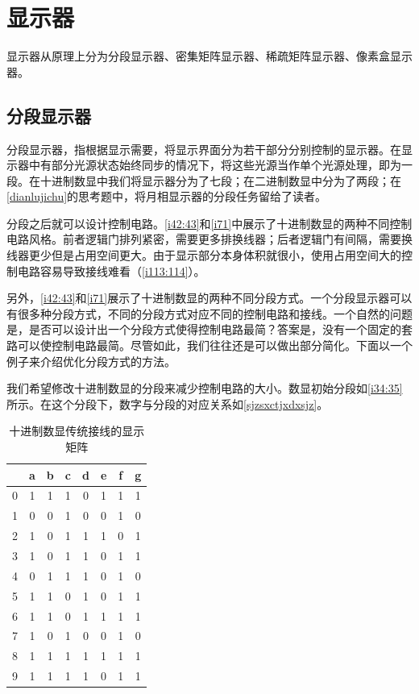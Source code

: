 

\section{显示器}
显示器从原理上分为分段显示器、密集矩阵显示器、稀疏矩阵显示器、像素盒显示器。

\subsection{分段显示器}
分段显示器，指根据显示需要，将显示界面分为若干部分分别控制的显示器。在显示器中有部分光源状态始终同步的情况下，将这些光源当作单个光源处理，即为一段。在十进制数显中我们将显示器分为了七段；在二进制数显中分为了两段；在\autoref{dianlujichu}的思考题中，将月相显示器的分段任务留给了读者。

分段之后就可以设计控制电路。\autoref{i42:43}和\autoref{i71}中展示了十进制数显的两种不同控制电路风格。前者逻辑门排列紧密，需要更多排换线器；后者逻辑门有间隔，需要换线器更少但是占用空间更大。由于显示部分本身体积就很小，使用占用空间大的控制电路容易导致接线难看（\autoref{i113:114}）。

另外，\autoref{i42:43}和\autoref{i71}展示了十进制数显的两种不同分段方式。一个分段显示器可以有很多种分段方式，不同的分段方式对应不同的控制电路和接线。一个自然的问题是，是否可以设计出一个分段方式使得控制电路最简？答案是，没有一个固定的套路可以使控制电路最简。尽管如此，我们往往还是可以做出部分简化。下面以一个例子来介绍优化分段方式的方法。

我们希望修改十进制数显的分段来减少控制电路的大小。数显初始分段如\autoref{i34:35}所示。在这个分段下，数字与分段的对应关系如\autoref{sjzsxctjxdxsjz}。

\begin{table}[!ht]
  \centering
  \begin{tabular}{c|ccccccc}
      & a & b & c & d & e & f & g \\\hline
    0 & 1 & 1 & 1 & 0 & 1 & 1 & 1 \\
    1 & 0 & 0 & 1 & 0 & 0 & 1 & 0 \\
    2 & 1 & 0 & 1 & 1 & 1 & 0 & 1 \\
    3 & 1 & 0 & 1 & 1 & 0 & 1 & 1 \\
    4 & 0 & 1 & 1 & 1 & 0 & 1 & 0 \\
    5 & 1 & 1 & 0 & 1 & 0 & 1 & 1 \\
    6 & 1 & 1 & 0 & 1 & 1 & 1 & 1 \\
    7 & 1 & 0 & 1 & 0 & 0 & 1 & 0 \\
    8 & 1 & 1 & 1 & 1 & 1 & 1 & 1 \\
    9 & 1 & 1 & 1 & 1 & 0 & 1 & 1
  \end{tabular}
  \caption{十进制数显传统接线的显示矩阵}\label{sjzsxctjxdxsjz}
\end{table}

